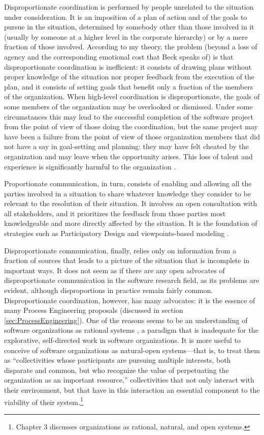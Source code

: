 Disproportionate coordination is performed by people unrelated to the situation under consideration. It is an imposition of a plan of action and of the goals to pursue in the situation, determined by somebody other than those involved in it (usually by someone at a higher level in the corporate hierarchy) or by a mere fraction of those involved. According to my theory, the problem (beyond a loss of agency and the corresponding emotional cost that Beck speaks of) is that disproportionate coordination is inefficient: it consists of drawing plans without proper knowledge of the situation nor proper feedback from the execution of the plan, and it consists of setting goals that benefit only a fraction of the members of the organization. When high-level coordination is disproportionate, the goals of some members of the organization may be overlooked or dismissed. Under some circumstances this may lead to the successful completion of the software project from the point of view of those doing the coordination, but the same project may have been a failure from the point of view of those organization members that did not have a say in goal-setting and planning: they may have felt cheated by the organization and may leave when the opportunity arises. This loss of talent and experience is significantly harmful to the organization \cite{DeMarco1987}.

Proportionate communication, in turn, consists of enabling and allowing all the parties involved in a situation to share whatever knowledge they consider to be relevant to the resolution of their situation. It involves an open consultation with all stakeholders, and it prioritizes the feedback from those parties most knowledgeable and more directly affected by the situation. It is the foundation of strategies such as Participatory Design \cite{Kensing1998} and viewpoints-based modeling \cite{Easterbrook2005}.

Disproportionate communication, finally, relies only on information from a fraction of sources that leads to a picture of the situation that is incomplete in important ways. It does not seem as if there are any open advocates of disproportionate communication in the software research field, as its problems are evident, although disproportions in practice remain fairly common. Disproportionate coordination, however, has many advocates: it is the essence of many Process Engineering proposals (discussed in section \ref{sec:ProcessEngineering}). One of the reasons seems to be an understanding of software organizations as rational systems \cite{Scott2007}, a paradigm that is inadequate for the explorative, self-directed work in software organizations. It is more useful to conceive of software organizations as natural-open systems---that is, to treat them as ``collectivities whose participants are pursuing multiple interests, both disparate and common, but who recognize the value of perpetuating the organization as an important resource,'' collectivities that not only interact with their environment, but that have in this interaction an essential component to the viability of their system.\footnote{Chapter 3 discusses organizations as rational, natural, and open systems.}

